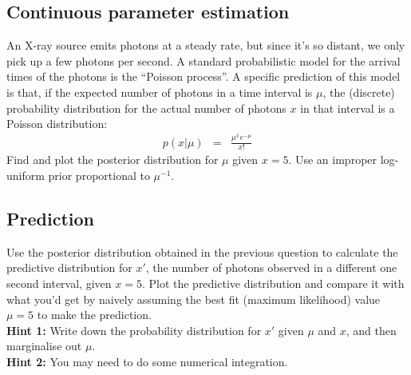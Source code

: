 \documentclass[a4paper, 11pt]{article}
\begin{document}
\subsection{Continuous parameter estimation}
An X-ray source emits photons at a steady rate, but since it's so distant, we
only pick up a few photons per second.
A standard probabilistic model for the arrival times of the photons is the
``Poisson process''. A specific prediction of this model is that, if the
expected number of photons in a time interval
is $\mu$, the (discrete) probability distribution for the actual number of photons $x$ in that interval is a Poisson distribution:
\begin{eqnarray}
p(x | \mu) &=& \frac{\mu^x e^{-\mu}}{x!}
\end{eqnarray}
Find and plot the posterior distribution for $\mu$ given $x=5$. Use an improper
log-uniform prior proportional to $\mu^{-1}$.

\subsection{Prediction}
Use the posterior distribution obtained in the previous question to calculate
the predictive distribution for $x'$, the number of photons observed in a
different one second interval, given $x=5$. Plot the predictive distribution
and compare it with what you'd get by naively assuming the best fit
(maximum likelihood) value $\mu=5$ to make the prediction.\\

{\bf Hint 1: }Write down the probability distribution for $x'$ given
$\mu$ and $x$, and then marginalise out $\mu$.\\

{\bf Hint 2: }You may need to do some numerical integration.
\end{document}
